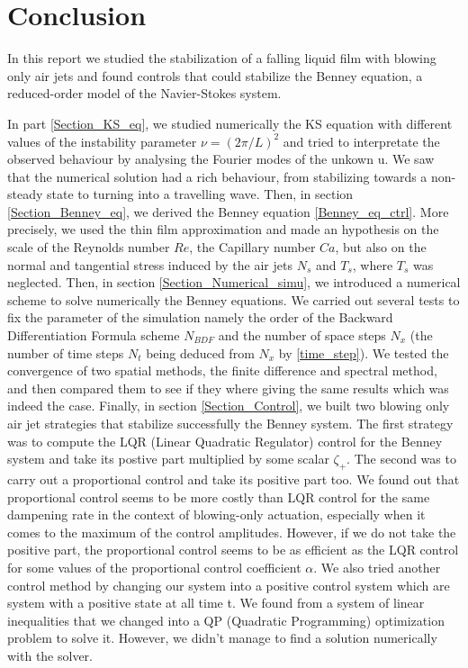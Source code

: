 \documentclass[12pt]{article}
\begin{document}
\section{Conclusion}

In this report we studied the stabilization of a falling liquid film with blowing
only air jets and found controls that could stabilize the Benney equation, a reduced-order
model of the Navier-Stokes system. 

In part \ref{Section_KS_eq}, we studied numerically the 
KS equation with different values of the instability parameter $\nu = (2\pi/L)^2$ and tried
to interpretate the observed behaviour by analysing the Fourier modes of the unkown u. We saw that the numerical solution had a rich behaviour, from stabilizing towards a non-steady state to turning into a travelling wave. Then, in 
section \ref{Section_Benney_eq}, we derived the Benney equation \eqref{Benney_eq_ctrl}. More precisely,
we used the thin film approximation and made an hypothesis on the scale of the Reynolds number $Re$, the Capillary
number $Ca$, but also on the normal and tangential stress induced by the air jets $N_s$ and $T_s$, where $T_s$ was 
neglected. Then, in section \ref{Section_Numerical_simu}, we introduced a numerical scheme to solve numerically
the Benney equations. We carried out several tests to fix the parameter of the simulation namely the order of the 
Backward Differentiation Formula scheme $N_{BDF}$ and the number of space steps $N_x$ (the number of time 
steps $N_t$ being deduced from $N_x$ by \eqref{time_step}). We tested the convergence of two spatial methods, 
the finite difference and spectral method, and then compared them to see if they where giving the same results
which was indeed the case. Finally, in section \ref{Section_Control}, we built two blowing only air jet strategies
that stabilize successfully the Benney system. The first strategy was to compute the LQR (Linear Quadratic Regulator)
control for the Benney system and take its postive part multiplied by some scalar $\zeta_+$. The second was to carry out 
a proportional control and take its positive part too. We found out that proportional control seems to be 
more costly than LQR control for the same dampening rate in the context of blowing-only actuation, especially when it comes to the maximum of the control amplitudes. However, if we 
do not take the positive part, the proportional control seems to be as efficient as the LQR control for some values of the 
proportional control coefficient $\alpha$. We also tried another control method by changing our system into a positive control
system which are system with a positive state at all time t. We found from \cite{pos_ctrl_paper} a system of linear inequalities
that we changed into a QP (Quadratic Programming) optimization problem to solve it. However, we didn't manage to find a solution
numerically with the solver. 
\\
\end{document}
